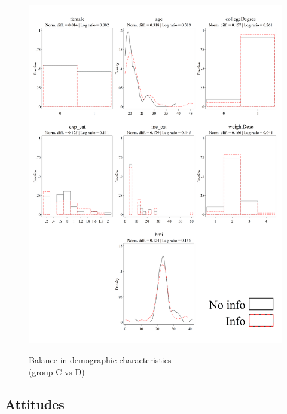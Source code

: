 \documentclass[12pt]{article}
\begin{document}
\begin{figure}[ht]
  \caption{Balance in demographic characteristics \\ (group C vs D)}\label{fig:group3_demographics}
  \begin{center}
  {\includegraphics[width=1\textwidth]{./figures/covDifTreat_1_demographics.png}}
  \end{center}
\end{figure}

\FloatBarrier

\clearpage

\subsection{Attitudes}
\end{document}
